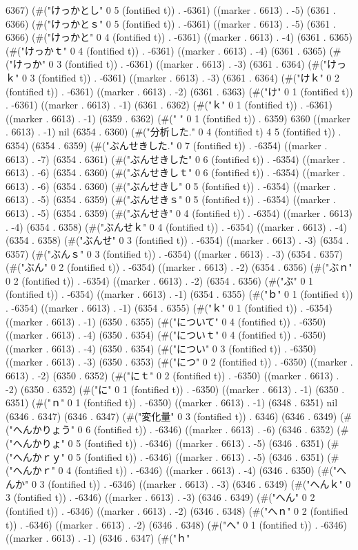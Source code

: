 6367) (#("けっかとし" 0 5 (fontified t)) . -6361) ((marker . 6613) . -5) (6361 . 6366) (#("けっかとｓ" 0 5 (fontified t)) . -6361) ((marker . 6613) . -5) (6361 . 6366) (#("けっかと" 0 4 (fontified t)) . -6361) ((marker . 6613) . -4) (6361 . 6365) (#("けっかｔ" 0 4 (fontified t)) . -6361) ((marker . 6613) . -4) (6361 . 6365) (#("けっか" 0 3 (fontified t)) . -6361) ((marker . 6613) . -3) (6361 . 6364) (#("けっｋ" 0 3 (fontified t)) . -6361) ((marker . 6613) . -3) (6361 . 6364) (#("けｋ" 0 2 (fontified t)) . -6361) ((marker . 6613) . -2) (6361 . 6363) (#("け" 0 1 (fontified t)) . -6361) ((marker . 6613) . -1) (6361 . 6362) (#("ｋ" 0 1 (fontified t)) . -6361) ((marker . 6613) . -1) (6359 . 6362) (#(" " 0 1 (fontified t)) . 6359) 6360 ((marker . 6613) . -1) nil (6354 . 6360) (#("分析した." 0 4 (fontified t) 4 5 (fontified t)) . 6354) (6354 . 6359) (#("ぶんせきした." 0 7 (fontified t)) . -6354) ((marker . 6613) . -7) (6354 . 6361) (#("ぶんせきした" 0 6 (fontified t)) . -6354) ((marker . 6613) . -6) (6354 . 6360) (#("ぶんせきしｔ" 0 6 (fontified t)) . -6354) ((marker . 6613) . -6) (6354 . 6360) (#("ぶんせきし" 0 5 (fontified t)) . -6354) ((marker . 6613) . -5) (6354 . 6359) (#("ぶんせきｓ" 0 5 (fontified t)) . -6354) ((marker . 6613) . -5) (6354 . 6359) (#("ぶんせき" 0 4 (fontified t)) . -6354) ((marker . 6613) . -4) (6354 . 6358) (#("ぶんせｋ" 0 4 (fontified t)) . -6354) ((marker . 6613) . -4) (6354 . 6358) (#("ぶんせ" 0 3 (fontified t)) . -6354) ((marker . 6613) . -3) (6354 . 6357) (#("ぶんｓ" 0 3 (fontified t)) . -6354) ((marker . 6613) . -3) (6354 . 6357) (#("ぶん" 0 2 (fontified t)) . -6354) ((marker . 6613) . -2) (6354 . 6356) (#("ぶｎ" 0 2 (fontified t)) . -6354) ((marker . 6613) . -2) (6354 . 6356) (#("ぶ" 0 1 (fontified t)) . -6354) ((marker . 6613) . -1) (6354 . 6355) (#("ｂ" 0 1 (fontified t)) . -6354) ((marker . 6613) . -1) (6354 . 6355) (#("ｋ" 0 1 (fontified t)) . -6354) ((marker . 6613) . -1) (6350 . 6355) (#("について" 0 4 (fontified t)) . -6350) ((marker . 6613) . -4) (6350 . 6354) (#("についｔ" 0 4 (fontified t)) . -6350) ((marker . 6613) . -4) (6350 . 6354) (#("につい" 0 3 (fontified t)) . -6350) ((marker . 6613) . -3) (6350 . 6353) (#("につ" 0 2 (fontified t)) . -6350) ((marker . 6613) . -2) (6350 . 6352) (#("にｔ" 0 2 (fontified t)) . -6350) ((marker . 6613) . -2) (6350 . 6352) (#("に" 0 1 (fontified t)) . -6350) ((marker . 6613) . -1) (6350 . 6351) (#("ｎ" 0 1 (fontified t)) . -6350) ((marker . 6613) . -1) (6348 . 6351) nil (6346 . 6347) (6346 . 6347) (#("変化量" 0 3 (fontified t)) . 6346) (6346 . 6349) (#("へんかりょう" 0 6 (fontified t)) . -6346) ((marker . 6613) . -6) (6346 . 6352) (#("へんかりょ" 0 5 (fontified t)) . -6346) ((marker . 6613) . -5) (6346 . 6351) (#("へんかｒｙ" 0 5 (fontified t)) . -6346) ((marker . 6613) . -5) (6346 . 6351) (#("へんかｒ" 0 4 (fontified t)) . -6346) ((marker . 6613) . -4) (6346 . 6350) (#("へんか" 0 3 (fontified t)) . -6346) ((marker . 6613) . -3) (6346 . 6349) (#("へんｋ" 0 3 (fontified t)) . -6346) ((marker . 6613) . -3) (6346 . 6349) (#("へん" 0 2 (fontified t)) . -6346) ((marker . 6613) . -2) (6346 . 6348) (#("へｎ" 0 2 (fontified t)) . -6346) ((marker . 6613) . -2) (6346 . 6348) (#("へ" 0 1 (fontified t)) . -6346) ((marker . 6613) . -1) (6346 . 6347) (#("ｈ" 